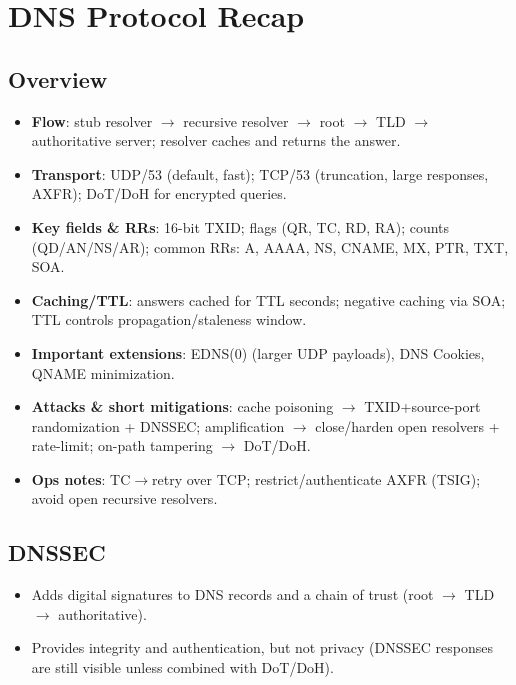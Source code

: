 \documentclass[11pt]{article}
\begin{document}
\section{DNS Protocol Recap}

\subsection{Overview}
\begin{itemize}
  \item \textbf{Flow}: stub resolver $\rightarrow$ recursive resolver $\rightarrow$ root $\rightarrow$ TLD $\rightarrow$ authoritative server; resolver caches and returns the answer.
  
  \item \textbf{Transport}: UDP/53 (default, fast); TCP/53 (truncation, large responses, AXFR); DoT/DoH for encrypted queries.
  
  \item \textbf{Key fields \& RRs}: 16-bit TXID; flags (QR, TC, RD, RA); counts (QD/AN/NS/AR); common RRs: A, AAAA, NS, CNAME, MX, PTR, TXT, SOA.
  
  \item \textbf{Caching/TTL}: answers cached for TTL seconds; negative caching via SOA; TTL controls propagation/staleness window.
  
  \item \textbf{Important extensions}: EDNS(0) (larger UDP payloads), DNS Cookies, QNAME minimization.
  
  \item \textbf{Attacks \& short mitigations}: cache poisoning $\rightarrow$ TXID+source-port randomization + DNSSEC; amplification $\rightarrow$ close/harden open resolvers + rate-limit; on-path tampering $\rightarrow$ DoT/DoH.
  
  \item \textbf{Ops notes}: TC$\rightarrow$retry over TCP; restrict/authenticate AXFR (TSIG); avoid open recursive resolvers.
\end{itemize}

\subsection{DNSSEC}
\begin{itemize}
  \item Adds digital signatures to DNS records and a chain of trust (root $\rightarrow$ TLD $\rightarrow$ authoritative).
  \item Provides integrity and authentication, but not privacy (DNSSEC responses are still visible unless combined with DoT/DoH).
\end{itemize}
\end{document}
